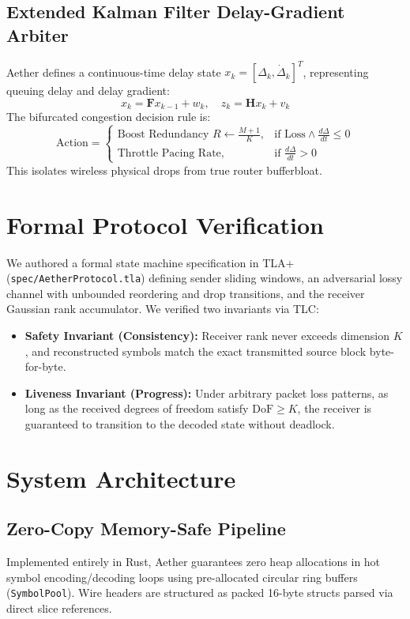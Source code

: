 \documentclass[10pt,twocolumn]{article}
\begin{document}
\subsection{Extended Kalman Filter Delay-Gradient Arbiter}
Aether defines a continuous-time delay state $x_k = [\Delta_k, \dot{\Delta}_k]^T$, representing queuing delay and delay gradient:
\begin{equation}
x_{k} = \mathbf{F} x_{k-1} + w_k, \quad z_k = \mathbf{H} x_k + v_k
\end{equation}
The bifurcated congestion decision rule is:
\begin{equation}
\text{Action} = \begin{cases}
\text{Boost Redundancy } R \leftarrow \frac{M+1}{K}, & \text{if } \text{Loss} \land \frac{d\Delta}{dt} \le 0 \\
\text{Throttle Pacing Rate}, & \text{if } \frac{d\Delta}{dt} > 0
\end{cases}
\end{equation}
This isolates wireless physical drops from true router bufferbloat.

\section{Formal Protocol Verification}
We authored a formal state machine specification in TLA+ (\texttt{spec/AetherProtocol.tla}) defining sender sliding windows, an adversarial lossy channel with unbounded reordering and drop transitions, and the receiver Gaussian rank accumulator. We verified two invariants via TLC:
\begin{itemize}
    \item \textbf{Safety Invariant (Consistency):} Receiver rank never exceeds dimension $K$, and reconstructed symbols match the exact transmitted source block byte-for-byte.
    \item \textbf{Liveness Invariant (Progress):} Under arbitrary packet loss patterns, as long as the received degrees of freedom satisfy $\text{DoF} \ge K$, the receiver is guaranteed to transition to the decoded state without deadlock.
\end{itemize}

\section{System Architecture}
\subsection{Zero-Copy Memory-Safe Pipeline}
Implemented entirely in Rust, Aether guarantees zero heap allocations in hot symbol encoding/decoding loops using pre-allocated circular ring buffers (\texttt{SymbolPool}). Wire headers are structured as packed 16-byte structs parsed via direct slice references.
\end{document}
